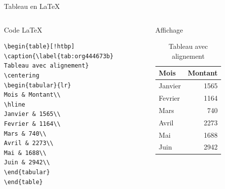 \documentclass[presentation,t]{beamer}
\begin{document}
\begin{frame}[fragile,label={sec:org953101a}]{Tableau en \LaTeX{}}
 \begin{columns}
\begin{column}{0.48\columnwidth}
Code \LaTeX{}

\lstset{language=[LaTeX]TeX,label= ,caption= ,captionpos=b,numbers=none}
\begin{lstlisting}
\begin{table}[!htbp]
\caption{\label{tab:org444673b}
Tableau avec alignement}
\centering
\begin{tabular}{lr}
Mois & Montant\\
\hline
Janvier & 1565\\
Fevrier & 1164\\
Mars & 740\\
Avril & 2273\\
Mai & 1688\\
Juin & 2942\\
\end{tabular}
\end{table}
\end{lstlisting}

\pause{}
\end{column}

\begin{column}{0.48\columnwidth}
Affichage

\begin{mdframed}
\begin{table}[!htbp]
\caption{\label{achats-par-mois}Tableau avec alignement}
\centering
\begin{tabular}{lr}
Mois & Montant\\
\hline
Janvier & 1565\\
Fevrier & 1164\\
Mars & 740\\
Avril & 2273\\
Mai & 1688\\
Juin & 2942\\
\end{tabular}
\end{table}

\end{mdframed}
\end{column}
\end{columns}
\end{frame}
\end{document}
